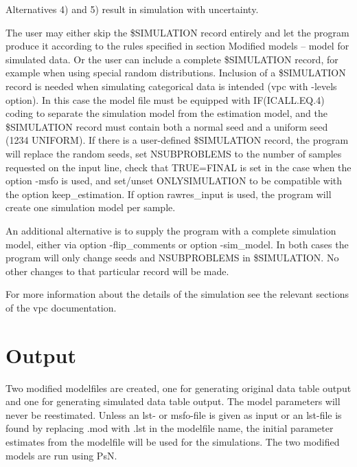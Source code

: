 Alternatives 4) and 5) result in simulation with uncertainty.

The user may either skip the \$SIMULATION record entirely and let the program produce it according to the rules specified in section Modified models – model for simulated data. Or the user can include a complete \$SIMULATION record, for example when using special random distributions. Inclusion of a \$SIMULATION record is needed when simulating categorical data is intended (vpc with -levels option). In this case the model file must be equipped with IF(ICALL.EQ.4) coding to separate the simulation model from the estimation model, and the \$SIMULATION record must contain both a normal seed and a uniform seed (1234 UNIFORM). If there is a user-defined \$SIMULATION record, the program will replace the random seeds, set NSUBPROBLEMS to the number of samples requested on the input line, check that TRUE=FINAL is set in the case when the option -msfo is used, and set/unset ONLYSIMULATION to be compatible with the option keep\_estimation. If option rawres\_input is used, the program will create one simulation model per sample.

An additional alternative is to supply the program with a complete simulation model, either via option -flip\_comments or option -sim\_model. In both cases the program will only change seeds and NSUBPROBLEMS in \$SIMULATION. No other changes to that particular record will be made.

For more information about the details of the simulation see the relevant sections of the vpc documentation.

\section{Output}
Two modified modelfiles are created, one for generating original data table output and one for generating simulated data table output. The model parameters will never be reestimated. Unless an lst- or msfo-file is given as input or an lst-file is found by replacing .mod with .lst in the modelfile name, the initial parameter estimates from the modelfile will be used for the simulations. The two modified models are run using PsN.



